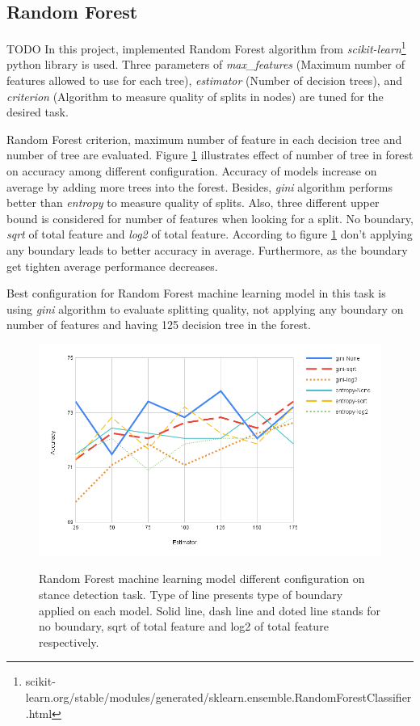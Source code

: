 \subsection{Random Forest}
{\color{green}TODO}
In this project, implemented Random Forest algorithm from \textit{scikit-learn}\footnote{scikit-learn.org/stable/modules/generated/sklearn.ensemble.RandomForestClassifier.html} python library is used. Three parameters of \textit{max\_features} (Maximum number of features allowed to use for each tree), \textit{estimator} (Number of decision trees), and \textit{criterion} (Algorithm to measure quality of splits in nodes) are tuned for the desired task.

Random Forest criterion, maximum number of feature in each decision tree and number of tree are evaluated. Figure \ref{fig:randomforest} illustrates effect of number of tree in forest on accuracy among different configuration. Accuracy of models increase on average by adding more trees into the forest. Besides, \textit{gini} algorithm performs better than \textit{entropy} to measure quality of splits. Also, three different upper bound is considered for number of features when looking for a split. No boundary, \textit{sqrt} of total feature and \textit{log2} of total feature. According to figure \ref{fig:randomforest} don't applying any boundary leads to better accuracy in average. Furthermore, as the boundary get tighten average performance decreases. 

Best configuration for Random Forest machine learning model in this task is using \textit{gini} algorithm to evaluate splitting quality, not applying any boundary on number of features and having 125 decision tree in the forest. 
\begin{figure}%
	\centering
	{\includegraphics[width=12.5cm]{statistics/randomforest.png} }
	\caption{Random Forest machine learning model different configuration on stance detection task. Type of line presents type of boundary applied on each model. Solid line, dash line and doted line stands for no boundary, sqrt of total feature and log2 of total feature respectively.}%
	\label{fig:randomforest}%
\end{figure}
